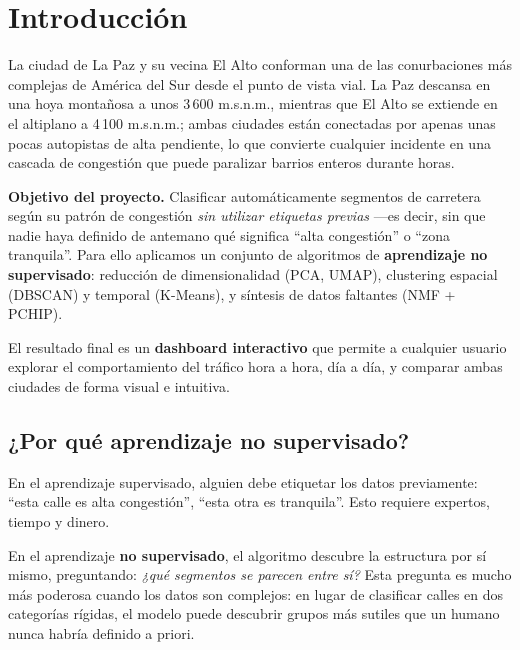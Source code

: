 \documentclass[12pt,a4paper]{article}
\begin{document}
\section{Introducción}

La ciudad de La Paz y su vecina El Alto conforman una de las conurbaciones
más complejas de América del Sur desde el punto de vista vial.
La Paz descansa en una hoya montañosa a unos 3\,600 m.s.n.m., mientras que
El Alto se extiende en el altiplano a 4\,100 m.s.n.m.;
ambas ciudades están conectadas por apenas unas pocas autopistas de alta
pendiente, lo que convierte cualquier incidente en una cascada de congestión
que puede paralizar barrios enteros durante horas.

\medskip

\textbf{Objetivo del proyecto.}
Clasificar automáticamente segmentos de carretera según su patrón de
congestión \emph{sin utilizar etiquetas previas} —es decir, sin que nadie
haya definido de antemano qué significa ``alta congestión'' o ``zona
tranquila''.
Para ello aplicamos un conjunto de algoritmos de \textbf{aprendizaje no
supervisado}: reducción de dimensionalidad (PCA, UMAP), clustering espacial
(DBSCAN) y temporal (K-Means), y síntesis de datos faltantes (NMF + PCHIP).

\medskip

El resultado final es un \textbf{dashboard interactivo} que permite a
cualquier usuario explorar el comportamiento del tráfico hora a hora, día
a día, y comparar ambas ciudades de forma visual e intuitiva.

\subsection{¿Por qué aprendizaje no supervisado?}

En el aprendizaje supervisado, alguien debe etiquetar los datos previamente:
``esta calle es alta congestión'', ``esta otra es tranquila''.
Esto requiere expertos, tiempo y dinero.

En el aprendizaje \textbf{no supervisado}, el algoritmo descubre la
estructura por sí mismo, preguntando: \textit{¿qué segmentos se parecen entre
sí?} Esta pregunta es mucho más poderosa cuando los datos son complejos:
en lugar de clasificar calles en dos categorías rígidas, el modelo puede
descubrir grupos más sutiles que un humano nunca habría definido a priori.
\end{document}
